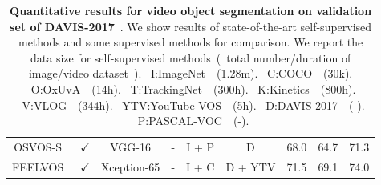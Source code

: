 \documentclass{article}
\begin{document}
\begin{table}[t]
{\begin{tabular}{ccccccccc}
      OSVOS-S~\cite{maninis2018video}  & $\checkmark$ & VGG-16 & - & I + P & D
			& 68.0   & 64.7 & 71.3  \\
      FEELVOS~\cite{voigtlaender2019feelvos}  & $\checkmark$ & Xception-65 & - & I + C & D + YTV
			& 71.5   & 69.1 & 74.0  \\
			\bottomrule
		\end{tabular}
	}
	\captionsetup{font=footnotesize}
	\caption{\textbf{Quantitative results for video object segmentation on validation set of DAVIS-2017}~\cite{pont20172017}. We show results of state-of-the-art self-supervised methods and some supervised methods for comparison. We report the data size for self-supervised methods~(~total number/duration of image/video dataset~). ~I:ImageNet~\cite{deng2009imagenet}~(1.28m). ~C:COCO~\cite{lin2014microsoft}~(30k). ~O:OxUvA~\cite{valmadre2018long}~(14h). ~T:TrackingNet~\cite{muller2018trackingnet}~(300h). ~K:Kinetics~\cite{carreira2017quo}~(800h). ~V:VLOG~\cite{fouhey2018lifestyle}~(344h). ~YTV:YouTube-VOS~\cite{xu2018youtube}~(5h). ~D:DAVIS-2017~\cite{pont20172017}~(-). ~P:PASCAL-VOC~\cite{everingham2015pascal}~(-).}
	\label{table:sota}
	\vspace{-20pt}
\end{table}
\end{document}
